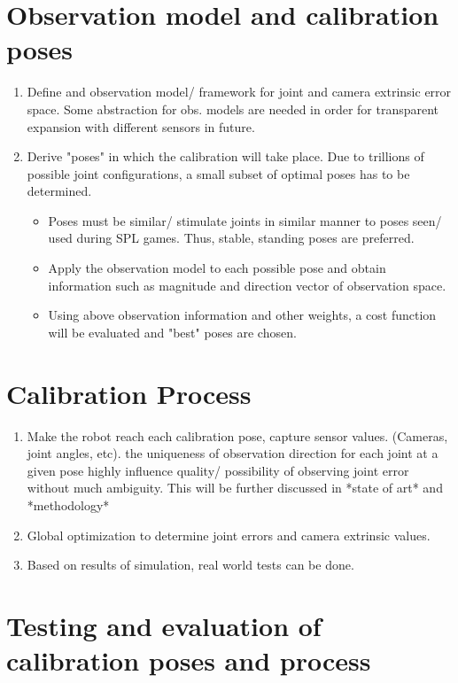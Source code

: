 \documentclass[english, printversion, nomenclature, notitle]{tuvisionthesis} %
\begin{document}
\section{Observation model and calibration poses}
\begin{enumerate}
	\item Define and observation model/ framework for joint and camera extrinsic error space.
	\subitem Some abstraction for obs. models are needed in order for transparent expansion with different sensors in future.
	\item Derive "poses" in which the calibration will take place. Due to trillions of possible joint configurations, a small subset of optimal poses has to be determined.
	\begin{itemize}
		\item Poses must be similar/ stimulate joints in similar manner to poses seen/ used during SPL games. Thus, stable, standing poses are preferred.
		\item Apply the observation model to each possible pose and obtain information such as magnitude and direction vector of observation space.
		\item Using above observation information and other weights, a cost function will be evaluated and "best" poses are chosen.
	\end{itemize}
\end{enumerate}
\section{Calibration Process}
\begin{enumerate}
	\item Make the robot reach each calibration pose, capture sensor values. (Cameras, joint angles, etc).
	\subitem the uniqueness of observation direction for each joint at a given pose highly influence quality/ possibility of observing joint error without much ambiguity. This will be further discussed in *state of art* and *methodology*
	\item Global optimization to determine joint errors and camera extrinsic values.
	\item Based on results of simulation, real world tests can be done.
\end{enumerate}

\section{Testing and evaluation of calibration poses and process}
\end{document}
